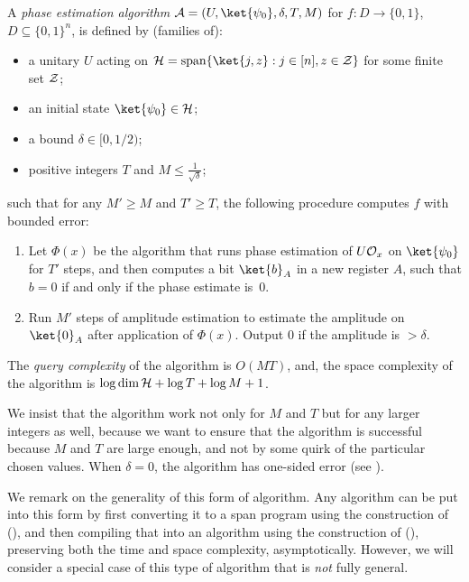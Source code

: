 \documentclass{toc}
\begin{document}
\begin{definition}\label{def:phase-estimation-alg}
A \emph{phase estimation algorithm} ${\cal A}=(U,\ket{\psi_0},\delta,T,M)$ for $f:D\rightarrow\{0,1\}$, $D\subseteq\{0,1\}^n$, is defined by (families of):
\begin{itemize}
\item a unitary $U$ acting on ${\cal H}=\mathrm{span}\{\ket{j,z}:j\in [n],z\in{\cal Z}\}$ for some finite set ${\cal Z}$;
\item an initial state $\ket{\psi_0}\in {\cal H}$;
\item a bound $\delta\in [0,1/2)$;
\item positive integers $T$ and $M\leq \frac{1}{\sqrt{\delta}}$;
\end{itemize}
such that for any $M'\geq M$ and $T'\geq T$, the following procedure computes $f$ with bounded error:
\begin{enumerate}
\item Let $\Phi(x)$ be the algorithm that runs phase estimation of $U{\cal O}_x$ on $\ket{\psi_0}$ for $T'$ steps, and then computes a bit $\ket{b}_A$ in a new register $A$, such that $b=0$ if and only if the phase estimate is~$0$.
\item Run $M'$ steps of amplitude estimation to estimate the amplitude on $\ket{0}_A$ after application of $\Phi(x)$. Output $0$ if the amplitude is $> {\delta}$.
\end{enumerate}
The \emph{query complexity} of the algorithm is $O(MT)$, and, the space complexity of the algorithm is $\log \dim {\cal H}+\log T+\log M+1$. 
\end{definition}

We insist that the algorithm work not only for $M$ and $T$ but for any larger integers as well, because we want to ensure that the algorithm is successful because $M$ and $T$ are large enough, and not by some quirk of the particular chosen values. When $\delta=0$, the algorithm has one-sided error (see ).

We remark on the generality of this form of algorithm. Any algorithm can be put into this form by first converting it to a span program using the construction of  (), and then compiling that into an algorithm using the construction of  (), preserving both the time and space complexity, asymptotically. However, we will consider a special case of this type of algorithm that is \emph{not} fully general. 
\end{document}
